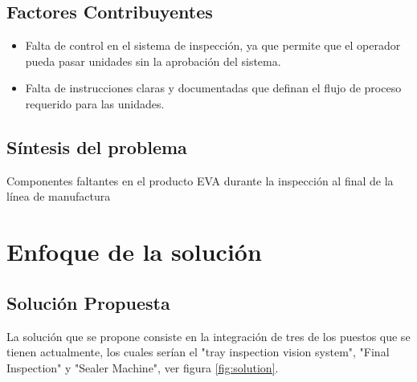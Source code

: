 \subsection{Factores Contribuyentes}

\begin{itemize}

    \item Falta de control en el sistema de inspecci\'on, ya que permite que el operador pueda pasar unidades sin la aprobaci\'on del sistema.
    
    \item Falta de instrucciones claras y documentadas que definan el flujo de proceso requerido para las unidades.

\end{itemize}

\subsection{S\'intesis del problema}
Componentes faltantes en el producto EVA durante la inspecci\'on al final de la l\'inea de manufactura

\newpage
\section{Enfoque de la soluci\'on}






\subsection{Soluci\'on Propuesta}

La soluci\'on que se propone consiste en la integraci\'on de tres de los puestos que se tienen actualmente, los cuales ser\'ian el "tray inspection vision system", "Final Inspection" y "Sealer Machine", ver figura \ref{fig:solution}. \par

